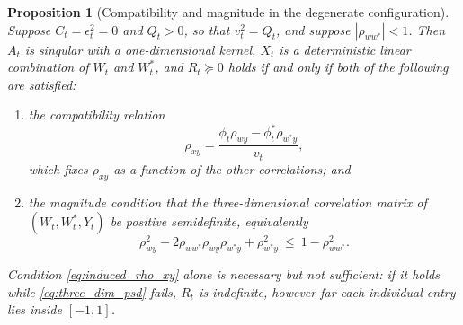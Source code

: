 \documentclass[11pt]{article}
\newtheorem{proposition}[proposition]{Proposition}
\theoremstyle{definition}
\begin{document}
\begin{proposition}[Compatibility and magnitude in the degenerate configuration]\label{prop:floor_overdetermined}
Suppose $C_t=\epsilon_t^2=0$ and $Q_t>0$, so that $v_t^2=Q_t$, and suppose $|\rho_{ww^*}|<1$. Then $A_t$ is singular with a one-dimensional kernel, $X_t$ is a deterministic linear combination of $W_t$ and $W_t^*$, and $R_t\succeq0$ holds if and only if \emph{both} of the following are satisfied:
\begin{enumerate}[label=(\roman*)]
\item the compatibility relation
\begin{equation}\label{eq:induced_rho_xy}
\rho_{xy}=\frac{\phi_t\rho_{wy}-\phi_t^*\rho_{w^*y}}{v_t},
\end{equation}
which fixes $\rho_{xy}$ as a function of the other correlations; and
\item the magnitude condition that the three-dimensional correlation matrix of $(W_t,W_t^*,Y_t)$ be positive semidefinite, equivalently
\begin{equation}\label{eq:three_dim_psd}
\rho_{wy}^2-2\rho_{ww^*}\rho_{wy}\rho_{w^*y}+\rho_{w^*y}^2\ \le\ 1-\rho_{ww^*}^2 .
\end{equation}
\end{enumerate}
Condition \eqref{eq:induced_rho_xy} alone is necessary but \emph{not} sufficient: if it holds while \eqref{eq:three_dim_psd} fails, $R_t$ is indefinite, however far each individual entry lies inside $[-1,1]$.
\end{proposition}
\end{document}
